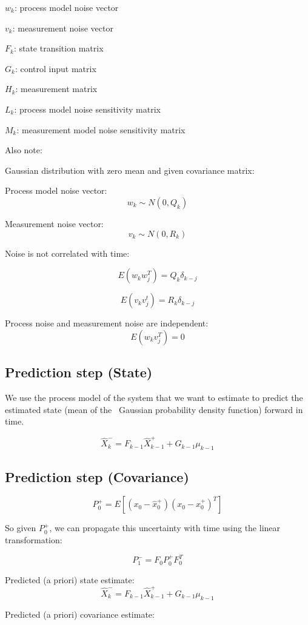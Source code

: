 \documentclass[11pt]{article}
\begin{document}
$w_k$: process model noise vector 

$v_k$: measurement noise vector

$F_k$: state transition matrix 

$G_k$: control input matrix

$H_k$: measurement matrix 

$L_k$: process model noise sensitivity matrix 

$M_k$: measurement model noise sensitivity matrix


Also note: 

Gaussian distribution with zero mean and given covariance matrix:

Process model noise vector: \[ w_k \sim N(0, Q_k) \]

Measurement noise vector: \[ v_k \sim N(0, R_k) \]

Noise is not correlated with time:

\[ E(w_k w_j^T) = Q_k \delta_{k-j} \]

\[ E(v_k v_j^t) = R_k \delta_{k-j} \] 

Process noise and measurement noise are independent:
\[ E(w_k v_j^T) = 0 \] 



\subsection{Prediction step (State)}

We use the process model of the system that we want to estimate to predict the estimated state (mean of the \
Gaussian probability density function) forward in time.

\[ \hat{X}^-_k = F_{k-1} \hat{X}^+_{k-1} + G_{k-1} \mu_{k-1}\]

\subsection{Prediction step (Covariance)}

\[ P^+_0 = E[ (x_0 - \hat{x}^+_0) (x_0 - \hat{x}^+_0)^T] \]

So given $P^+_0$, we can propagate this uncertainty with time using the linear transformation:

\[ P^-_1 = F_0 P^+_{0} F^T_{0} \]


Predicted (a priori) state estimate:
\[ \hat{X}^-_k = F_{k-1} \hat{X}^+_{k-1} + G_{k-1} \mu_{k-1}\]

Predicted (a priori) covariance estimate:
\end{document}
